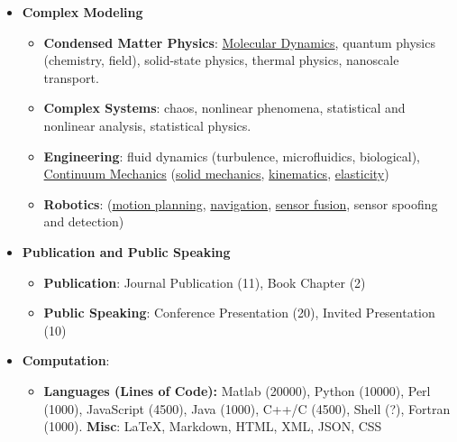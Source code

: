 \documentclass{article}
\begin{document}
\begin{itemize}[leftmargin=*]


  \item \textbf{Complex Modeling}
  \begin{itemize}
    \item \textbf{Condensed Matter Physics}: \href{https://en.wikipedia.org/wiki/Molecular_dynamics}{Molecular Dynamics}, quantum physics (chemistry, field), solid-state physics, thermal physics, nanoscale transport.
    \item \textbf{Complex Systems}: chaos, nonlinear phenomena, statistical and nonlinear analysis, statistical physics.
    \item \textbf{Engineering}: fluid dynamics (turbulence,  microfluidics, biological), \href{https://en.wikipedia.org/wiki/Continuum_mechanics}{Continuum Mechanics} (\href{https://en.wikipedia.org/wiki/Solid_mechanics}{solid mechanics}, \href{https://en.wikipedia.org/wiki/Kinematics}{kinematics}, \href{https://en.wikipedia.org/wiki/Elasticity_(physics)}{elasticity})
    \item \textbf{Robotics}: (\href{https://en.wikipedia.org/wiki/Motion_planning}{motion planning}, \href{https://en.wikipedia.org/wiki/Mobile_robot_navigation}{navigation}, \href{https://en.wikipedia.org/wiki/Sensor_fusion}{sensor fusion}, sensor spoofing and detection)
  \end{itemize}

  \item \textbf{Publication and Public Speaking} 
  \begin{itemize}
    \item \textbf{Publication}: Journal Publication (11), Book Chapter (2) 
    \item \textbf{Public Speaking}: Conference Presentation (20), Invited Presentation (10)
  \end{itemize}

  \item \textbf{Computation}: 
  \begin{itemize}

    \item \textbf{Languages (Lines of Code): } Matlab (20000), Python (10000), Perl (1000), JavaScript (4500), Java (1000), C++/C (4500), Shell (?), Fortran (1000). \textbf{Misc}: \LaTeX, Markdown, HTML, XML, JSON, CSS 


\end{itemize}
\end{itemize}
\end{document}
